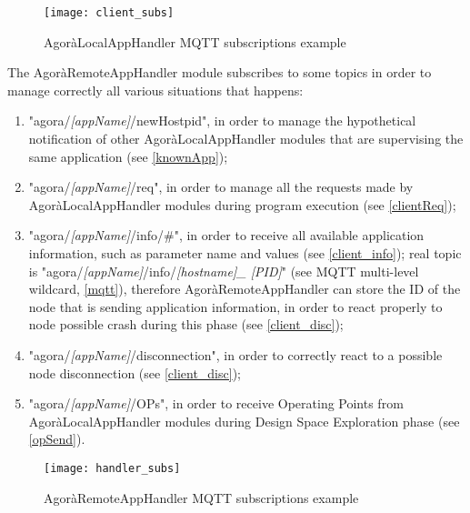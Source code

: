 \begin{figure}[H]

    \centering
    \texttt{[image: client\_subs]}
    \caption{AgoràLocalAppHandler MQTT subscriptions example}
    
\end{figure}

The AgoràRemoteAppHandler module subscribes to some topics in order to manage correctly all various situations that happens:

\begin{enumerate}

    \item "agora/\textit{[appName]}/newHostpid", in order to manage the hypothetical notification of other AgoràLocalAppHandler modules that are supervising the same application (see \ref{knownApp});
    
    \item "agora/\textit{[appName]}/req", in order to manage all the requests made by AgoràLocalAppHandler modules during program execution (see \ref{clientReq});
    
    \item "agora/\textit{[appName]}/info/\#", in order to receive all available application information, such as parameter name and values (see \ref{client_info}); real topic is "agora\slash{}\textit{[appName]}\slash{}info\slash{}\textit{[host\-name]\_ [PID]}" (see MQTT multi-level wildcard, \ref{mqtt}), therefore AgoràRemote\-App\-Handler can store the ID of the node that is sending application information, in order to react properly to node possible crash during this phase (see \ref{client_disc});
    
    \item "agora/\textit{[appName]}/disconnection", in order to correctly react to a possible node disconnection (see \ref{client_disc});
    
    \item "agora/\textit{[appName]}/OPs", in order to receive Operating Points from AgoràLocalAppHandler modules during Design Space Exploration phase (see \ref{opSend}).

\end{enumerate}

\begin{figure}[H]

    \centering
    \texttt{[image: handler\_subs]}
    \caption{AgoràRemoteAppHandler MQTT subscriptions example}
    
\end{figure}


